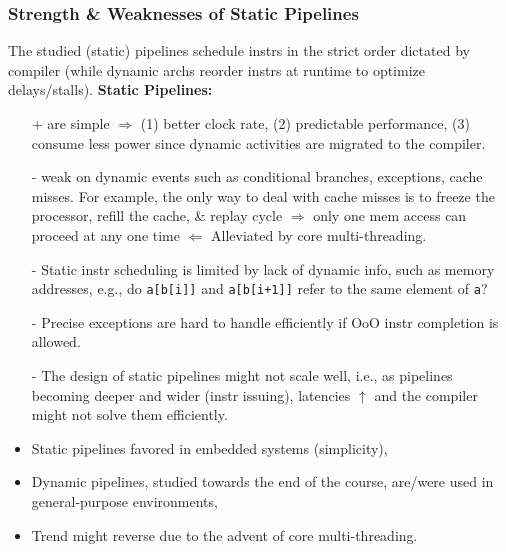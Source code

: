\documentclass{beamer}
\renewcommand{\emph}[1]{\textcolor{structure}{#1}}
\newcommand{\emp}[1]{\textcolor{DikuRed}{ #1}}
\begin{document}
\begin{frame}[fragile,t]
\frametitle{Strength \& Weaknesses of Static Pipelines}


\begin{scriptsize}
The studied (static) pipelines schedule instrs in the strict order 
dictated by compiler (while dynamic archs reorder instrs at runtime 
to optimize delays/stalls). {\bf Static Pipelines:} 
\begin{itemize}
\item[+] are \emph{simple} $\Rightarrow$ (1) better clock rate,
            (2) predictable performance, (3) consume less power since
                dynamic activities are migrated to the compiler.
\item[-] \emp{weak on dynamic events} such as conditional branches,
            exceptions, cache misses. 
        For example, the only way to deal with cache misses is to freeze
            the processor, refill the cache, \& replay cycle $\Rightarrow$
            only one mem access can proceed at any one time
            $\Leftarrow$ \emph{Alleviated by core multi-threading.}
\item[-] \emp{Static instr scheduling is limited by lack of dynamic info},
            such as memory addresses, e.g., do {\tt a[b[i]]} and 
            {\tt a[b[i+1]]} refer to the same element of {\tt a}?
\item[-] \emp{Precise exceptions are hard to handle efficiently} if OoO
            instr completion is allowed.
\item[-] \emp{The design of static pipelines might not scale well}, 
            i.e., as pipelines becoming deeper
            and wider (instr issuing), latencies $\uparrow$ and the
            compiler might not solve them efficiently.  
\end{itemize}

\bigskip
\end{scriptsize}

\begin{itemize}
\item Static pipelines favored in embedded systems (simplicity),
\item Dynamic pipelines, studied towards the end of the course, are/were used
        in general-purpose environments,
\item \emph{Trend might reverse due to the advent of core multi-threading}.  
\end{itemize}

\end{frame}
\end{document}
